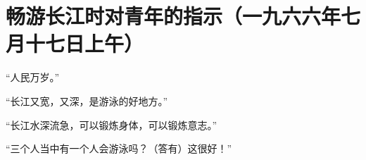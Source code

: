 \section[畅游长江时对青年的指示（一九六六年七月十七日上午）]{畅游长江时对青年的指示（一九六六年七月十七日上午）}


“人民万岁。”

“长江又宽，又深，是游泳的好地方。”

“长江水深流急，可以锻炼身体，可以锻炼意志。”

“三个人当中有一个人会游泳吗？（答有）这很好！”



